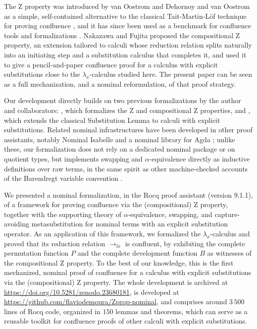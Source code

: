 \documentclass[runningheads]{llncs}
\begin{document}
 The Z property was introduced by van Oostrom \cite{oostromDraftYourMind2007} and Dehornoy and van Oostrom \cite{dehornoy2008z} as a simple, self-contained alternative to the classical Tait-Martin-Löf technique for proving confluence \cite{hondaConfluenceProofsLambdaMuCalculi2021,nakazawaCallbyvalue2017,nakazawaPropertyShufflingCalculus2023}, and it has since been used as a benchmark for confluence tools and formalizations \cite{felgenhauerProperty2016,vanoostrom:LIPIcs.FSCD.2021.24}. Nakazawa and Fujita \cite{nakazawaCompositionalConfluenceProofs2016} proposed the compositional Z property, an extension tailored to calculi whose reduction relation splits naturally into an initiating step and a substitution calculus that completes it, and used it to give a pencil-and-paper confluence proof for a calculus with explicit substitutions close to the $\lambda_x$-calculus studied here. The present paper can be seen as a full mechanization, and a nominal reformulation, of that proof strategy.

Our development directly builds on two previous formalizations by the author and collaborators: \cite{fmm2021}, which formalizes the Z and compositional Z properties, and \cite{limaFormalizedExtensionSubstitution2023}, which extends the classical Substitution Lemma to calculi with explicit substitutions. Related nominal infrastructures have been developed in other proof assistants, notably Nominal Isabelle \cite{urbanGeneralBindingsAlphaEquivalence2012} and a nominal library for Agda \cite{gabbayNominalTechniquesAgda}; unlike these, our formalization does not rely on a dedicated nominal package or on quotient types, but implements swapping and $\alpha$-equivalence directly as inductive definitions over raw terms, in the same spirit as other machine-checked accounts of the Barendregt variable convention \cite{copelloMachinecheckedProofChurchRosser2018,urbanBarendregtsVariableConvention2007,aydemirEngineeringFormalMetatheory2008}.

\smallskip
{} We presented a nominal formalization, in the Rocq proof assistant (version 9.1.1), of a framework for proving confluence via the (compositional) Z property, together with the supporting theory of $\alpha$-equivalence, swapping, and capture-avoiding metasubstitution for nominal terms with an explicit substitution operator. As an application of this framework, we formalized the $\lambda_x$-calculus and proved that its reduction relation $\to_{lx}$ is confluent, by exhibiting the complete permutation function $P$ and the complete development function $B$ as witnesses of the compositional Z property. To the best of our knowledge, this is the first mechanized, nominal proof of confluence for a calculus with explicit substitutions via the (compositional) Z property. The whole development is archived at \url{https://doi.org/10.5281/zenodo.23680181}, is developed at \url{https://github.com/flaviodemoura/Zprop-nominal}, and comprises around $3\,500$ lines of Rocq code, organized in $150$ lemmas and theorems, which can serve as a reusable toolkit for confluence proofs of other calculi with explicit substitutions.
\end{document}
